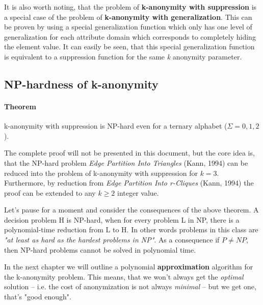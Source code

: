 It is also worth noting, that the problem of \textbf{k-anonymity with suppression} is a special case of the problem of \textbf{k-anonymity with generalization}. \cite{aggarwal} This can be proven by using a special generalization function which only has one level of generalization for each attribute domain which corresponds to completely hiding the element value. It can easily be seen, that this special generalization function is equivalent to a suppression function for the same \textit{k} anonymity parameter.

\subsection{NP-hardness of k-anonymity}

\paragraph{Theorem} k-anonymity with suppression is NP-hard even for a ternary alphabet (\(\Sigma = {0, 1, 2}\)). \cite{aggarwal}

The complete proof will not be presented in this document, but the core idea is, that the NP-hard problem \textit{Edge Partition Into Triangles} (Kann, 1994) can be reduced into the problem of k-anonymity with suppression for \(k=3\). \cite{aggarwal} Furthermore, by reduction from \textit{Edge Partition Into r-Cliques} (Kann, 1994) the proof can be extended to any \(k \ge 2\) integer value.

Let's pause for a moment and consider the consequences of the above theorem. A decision problem H is NP-hard, when for every problem L in NP, there is a polynomial-time reduction from L to H. \cite{leeuwen} In other words problems in this class are \textit{"at least as hard as the hardest problems in NP"}. \cite{wiki07} As a consequence if \textbf{\(P \neq NP\)}, then NP-hard problems cannot be solved in polynomial time. \cite{wiki06, wiki07}

In the next chapter we will outline a polynomial \textbf{approximation} algorithm for the k-anonymity problem. This means, that we won't always get the \textit{optimal} solution -- i.e. the cost of anonymization is not  always \textit{minimal} -- but we get one, that's "good enough".
